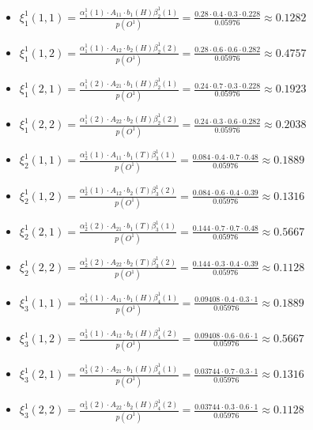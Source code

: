 \documentclass[11pt,a4paper]{article}
\begin{document}
	\begin{itemize}
		\item $ \xi_1^1(1, 1) = \frac{\alpha_1^1(1) \cdot A_{11} \cdot b_1(H) \beta_{2}^1(1)}{p(O^1)} =  \frac{0.28 \cdot 0.4 \cdot 0.3 \cdot 0.228}{0.05976} \approx 0.1282 $
		\item $ \xi_1^1(1, 2) = \frac{\alpha_1^1(1) \cdot A_{12} \cdot b_2(H) \beta_{2}^1(2)}{p(O^1)} =  \frac{0.28 \cdot 0.6 \cdot 0.6 \cdot 0.282}{0.05976} \approx 0.4757 $
		\item $ \xi_1^1(2, 1) = \frac{\alpha_1^1(2) \cdot A_{21} \cdot b_1(H) \beta_{2}^1(1)}{p(O^1)} =  \frac{0.24 \cdot 0.7 \cdot 0.3 \cdot 0.228}{0.05976} \approx 0.1923 $
		\item $ \xi_1^1(2, 2) = \frac{\alpha_1^1(2) \cdot A_{22} \cdot b_2(H) \beta_{2}^1(2)}{p(O^1)} =  \frac{0.24 \cdot 0.3 \cdot 0.6 \cdot 0.282}{0.05976}\approx 0.2038 $
		\item $ \xi_2^1(1, 1) = \frac{\alpha_2^1(1) \cdot A_{11} \cdot b_1(T) \beta_{3}^1(1)}{p(O^1)}=  \frac{0.084 \cdot 0.4 \cdot 0.7 \cdot 0.48}{0.05976} \approx 0.1889 $
		\item $ \xi_2^1(1, 2) = \frac{\alpha_2^1(1) \cdot A_{12} \cdot b_2(T) \beta_{3}^1(2)}{p(O^1)} =  \frac{0.084 \cdot 0.6 \cdot 0.4 \cdot 0.39}{0.05976} \approx 0.1316 $
		\item $ \xi_2^1(2, 1) = \frac{\alpha_2^1(2) \cdot A_{21} \cdot b_1(T) \beta_{3}^1(1)}{p(O^1)} =  \frac{0.144 \cdot 0.7 \cdot 0.7 \cdot 0.48}{0.05976} \approx 0.5667 $
		\item $ \xi_2^1(2, 2) = \frac{\alpha_2^1(2) \cdot A_{22} \cdot b_2(T) \beta_{3}^1(2)}{p(O^1)}=  \frac{0.144 \cdot 0.3 \cdot 0.4 \cdot 0.39}{0.05976} \approx 0.1128 $
		\item $ \xi_3^1(1, 1) = \frac{\alpha_3^1(1) \cdot A_{11} \cdot b_1(H) \beta_{4}^1(1)}{p(O^1)} =  \frac{0.09408 \cdot 0.4 \cdot 0.3 \cdot 1}{0.05976} \approx 0.1889 $
		\item $ \xi_3^1(1, 2) = \frac{\alpha_3^1(1) \cdot A_{12} \cdot b_2(H) \beta_{4}^1(2)}{p(O^1)} =  \frac{0.09408 \cdot 0.6 \cdot 0.6 \cdot 1}{0.05976} \approx 0.5667 $
		\item $ \xi_3^1(2, 1) = \frac{\alpha_3^1(2) \cdot A_{21} \cdot b_1(H) \beta_{4}^1(1)}{p(O^1)} =  \frac{0.03744 \cdot 0.7 \cdot 0.3 \cdot 1}{0.05976} \approx 0.1316 $
		\item $ \xi_3^1(2, 2) = \frac{\alpha_3^1(2) \cdot A_{22} \cdot b_2(H) \beta_{4}^1(2)}{p(O^1)}=  \frac{0.03744 \cdot 0.3 \cdot 0.6 \cdot 1}{0.05976} \approx 0.1128 $
	\end{itemize}
	
\end{document}
